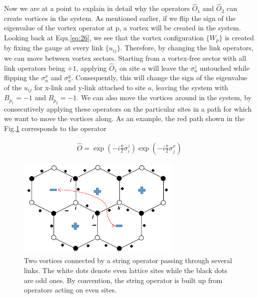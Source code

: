\documentclass{article}
\begin{document}
Now we are at a point to explain in detail why the operators $\hat{O}_1$ and $\hat{O}_2$ can create vortices in the system. As mentioned earlier, if we flip the sign of the eigenvalue of the vortex operator at p, a vortex will be created in the system. Looking back at Equ.\hspace{0.2mm}\ref{eq:26}, we see that the vortex configuration $\{W_p\}$ is created by fixing the gauge at every link $\{u_{ij}\}$. Therefore, by changing the link operators, we can move between vortex sectors. Starting from a vortex-free sector with all link operators being $+1$, applying $\hat{O}_1$ on site $a$ will leave the $\sigma^z_a$ untouched while flipping the $\sigma^x_a$ and $\sigma^y_a$. Consequently, this will change the sign of the eigenvalue of the $u_{ij}$ for x-link and y-link attached to site $a$, leaving the system with $B_{p_1} = -1$ and $B_{p_2} = -1$. We can also move the vortices around in the system, by consecutively applying these operators on the particular sites in a path for which we want to move the vortices along. As an example, the red path shown in the Fig.\hspace{0.2mm}\ref{fig:string} corresponds to the operator

\begin{equation}
	\begin{aligned}
		\hat{O} = \exp{(-i\frac{\pi}{2}\sigma^z_i)} \exp{(-i\frac{\pi}{2}\sigma^x_j)}
		\end{aligned}
\end{equation}

\begin{figure}[!htb]
    \centering
    \includegraphics[width=0.7\textwidth]{./images/Anyons_Strings}
    \caption{Two vortices connected by a string operator passing through several links. The white dots denote even lattice sites while the black dots are odd ones. By convention, the string operator is built up from operators acting on even sites.}
    \label{fig:string}
\end{figure}{}
\end{document}
